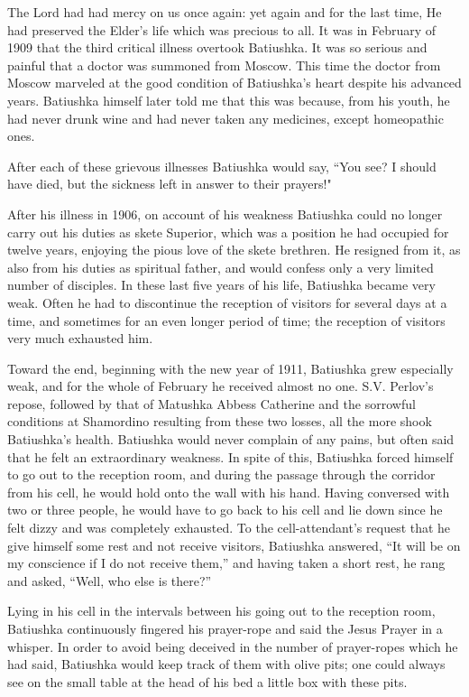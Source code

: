 The Lord had had mercy on us once again: yet again and for the last time, He had preserved the Elder's life which was precious to all. It was in February of 1909 that the third critical illness overtook Batiushka. It was so serious and painful that a doctor was summoned from Moscow. This time the doctor from Moscow marveled at the good condition of Batiushka's heart despite his advanced years. Batiushka himself later told me that this was because, from his youth, he had never drunk wine and had never taken any medicines, except homeopathic ones.

After each of these grievous illnesses Batiushka would say, “You see? I should have died, but the sickness left in answer to their prayers!"

After his illness in 1906, on account of his weakness Batiushka could no longer carry out his duties as skete Superior, which was a position he had occupied for twelve years, enjoying the pious love of the skete brethren. He resigned from it, as also from his duties as spiritual father, and would confess only a very limited number of disciples. In these last five years of his life, Batiushka became very weak. Often he had to discontinue the reception of visitors for several days at a time, and sometimes for an even longer period of time; the reception of visitors very much exhausted him.

Toward the end, beginning with the new year of 1911, Batiushka grew especially weak, and for the whole of February he received almost no one. S.V. Perlov's repose, followed by that of Matushka Abbess Catherine and the sorrowful conditions at Shamordino resulting from these two losses, all the more shook Batiushka's health. Batiushka would never complain of any pains, but often said that he felt an extraordinary weakness. In spite of this, Batiushka forced himself to go out to the reception room, and during the passage through the corridor from his cell, he would hold onto the wall with his hand. Having conversed with two or three people, he would have to go back to his cell and lie down since he felt dizzy and was completely exhausted. To the cell-attendant's request that he give himself some rest and not receive visitors, Batiushka answered, “It will be on my conscience if I do not receive them,” and having taken a short rest, he rang and asked, “Well, who else is there?”

Lying in his cell in the intervals between his going out to the reception room, Batiushka continuously fingered his prayer-rope and said the Jesus Prayer in a whisper. In order to avoid being deceived in the number of prayer-ropes which he had said, Batiushka would keep track of them with olive pits; one could always see on the small table at the head of his bed a little box with these pits.

